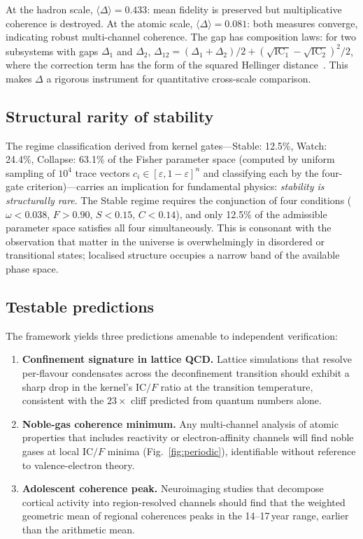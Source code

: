 \documentclass[
  aps,
  prx,
  twocolumn,
  superscriptaddress,
  nofootinbib,
  floatfix
]{revtex4-2}
\newcommand{\eps}{\varepsilon}
\newcommand{\IC}{\mathrm{IC}}
\begin{document}
At the hadron scale, $\langle\Delta\rangle = 0.433$: mean fidelity
is preserved but multiplicative coherence is destroyed. At the
atomic scale, $\langle\Delta\rangle = 0.081$: both measures converge,
indicating robust multi-channel coherence. The gap has composition
laws: for two subsystems with gaps $\Delta_1$ and $\Delta_2$,
$\Delta_{12} = (\Delta_1 + \Delta_2)/2
+ (\sqrt{\IC_1} - \sqrt{\IC_2})^2/2$, where the correction term has
the form of the squared Hellinger
distance~\cite{hellinger1909}. This makes $\Delta$ a rigorous
instrument for quantitative cross-scale comparison.

\subsection{Structural rarity of stability}

The regime classification derived from kernel
gates---Stable: 12.5\%, Watch: 24.4\%, Collapse: 63.1\% of the
Fisher parameter space (computed by uniform sampling of $10^4$
trace vectors $c_i \in [\eps, 1{-}\eps]^n$ and classifying each
by the four-gate criterion)---carries an implication for fundamental
physics: \emph{stability is structurally rare}. The Stable regime
requires the conjunction of four conditions ($\omega < 0.038$,
$F > 0.90$, $S < 0.15$, $C < 0.14$), and only 12.5\% of the
admissible parameter space satisfies all four simultaneously. This is
consonant with the observation that matter in the universe is
overwhelmingly in disordered or transitional states; localised
structure occupies a narrow band of the available phase space.

\subsection{Testable predictions}

The framework yields three predictions amenable to independent
verification:

\begin{enumerate}[leftmargin=2em,itemsep=2pt]
\item \textbf{Confinement signature in lattice QCD.}
  Lattice simulations that resolve per-flavour condensates
  across the deconfinement transition should exhibit a sharp
  drop in the kernel's $\IC/F$ ratio at the transition
  temperature, consistent with the $23\times$ cliff predicted
  from quantum numbers alone.
\item \textbf{Noble-gas coherence minimum.}
  Any multi-channel analysis of atomic properties that includes
  reactivity or electron-affinity channels will find noble gases at
  local $\IC/F$ minima (Fig.~\ref{fig:periodic}), identifiable
  without reference to valence-electron theory.
\item \textbf{Adolescent coherence peak.}
  Neuroimaging studies that decompose cortical activity into
  region-resolved channels should find that the weighted geometric
  mean of regional coherences peaks in the 14--17\,year range,
  earlier than the arithmetic mean.
\end{enumerate}
\end{document}
